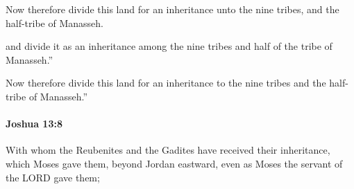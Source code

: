 			\begin{versebox}
					\item[BHS] 
					\item[ASV] Now therefore divide this land for an inheritance unto the nine tribes, and the half-tribe of Manasseh.
					\item[NIV] and divide it as an inheritance among the nine tribes and half of the tribe of Manasseh.”
					\item[NRSV] Now therefore divide this land for an inheritance to the nine tribes and the half-tribe of Manasseh.”
			\end{versebox}

		\paragraph{Joshua 13:8} %
			\label{JOSHUA-13-8}

			With whom the Reubenites and the Gadites have received their inheritance, which Moses gave them, beyond Jordan eastward, even as Moses the servant of the LORD gave them;

